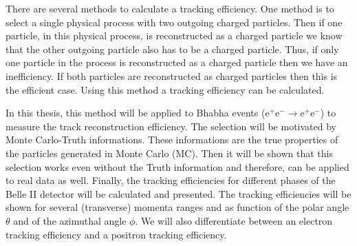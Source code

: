 \documentclass[a4paper,11pt,twosided,final,german,openbib,pdftex,listof=totoc,bibliography=totoc]{scrbook}
\begin{document}
There are several methods to calculate a tracking efficiency. One method is to select a single physical process with two outgoing charged particles. Then if one particle, in this physical process, is reconstructed as a charged particle we know that the other outgoing particle also has to be a charged particle. Thus, if only one particle in the process is reconstructed as a charged particle then we have an inefficiency. If both particles are reconstructed as charged particles then this is the efficient case. Using this method a tracking efficiency can be calculated.
\newline
 


In this thesis, this method will be applied to Bhabha events ($\textrm{e}^+ \textrm{e}^- \rightarrow \textrm{e}^+\textrm{e}^-$) to measure the track reconstruction efficiency. The selection will be motivated by Monte Carlo-Truth informations. These informations are the true properties of the particles generated in Monte Carlo (MC). Then it will be shown that this selection works even without the Truth information and therefore, can be applied to real data as well. Finally, the tracking efficiencies for different phases of the Belle II detector will be calculated and presented. The tracking efficiencies will be shown for several (transverse) momenta ranges and as function of the polar angle $\theta$ and of the azimuthal angle $\phi$. We will also differentiate between an electron tracking efficiency and a positron tracking efficiency.
\newline


\end{document}

